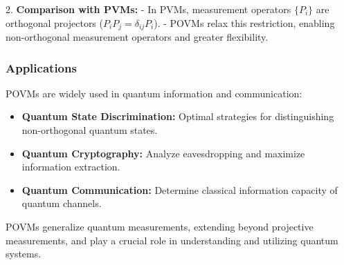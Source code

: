 2. \textbf{Comparison with PVMs:} 
   - In PVMs, measurement operators \( \{P_i\} \) are orthogonal projectors (\( P_iP_j = \delta_{ij}P_i \)).
   - POVMs relax this restriction, enabling non-orthogonal measurement operators and greater flexibility.

\subsubsection{Applications}
POVMs are widely used in quantum information and communication:
\begin{itemize}
    \item \textbf{Quantum State Discrimination:} Optimal strategies for distinguishing non-orthogonal quantum states.
    \item \textbf{Quantum Cryptography:} Analyze eavesdropping and maximize information extraction.
    \item \textbf{Quantum Communication:} Determine classical information capacity of quantum channels.
\end{itemize}

POVMs generalize quantum measurements, extending beyond projective measurements, and play a crucial role in understanding and utilizing quantum systems.
